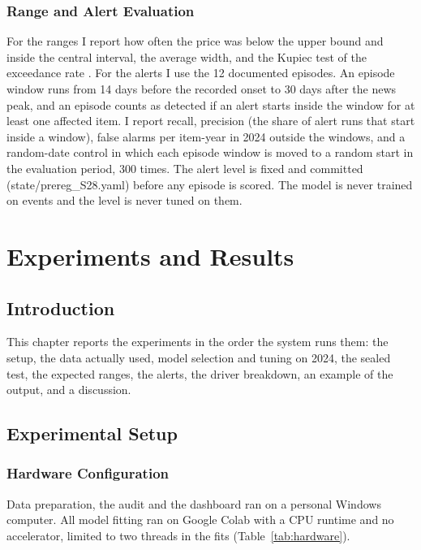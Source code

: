 \documentclass[12pt]{report}
\begin{document}
\subsection{Range and Alert Evaluation}
For the ranges I report how often the price was below the upper bound and inside the central interval, the average width, and the Kupiec test of the exceedance rate \cite{kupiec}. For the alerts I use the 12 documented episodes. An episode window runs from 14 days before the recorded onset to 30 days after the news peak, and an episode counts as detected if an alert starts inside the window for at least one affected item. I report recall, precision (the share of alert runs that start inside a window), false alarms per item-year in 2024 outside the windows, and a random-date control in which each episode window is moved to a random start in the evaluation period, 300 times. The alert level is fixed and committed (state/prereg\_S28.yaml) before any episode is scored. The model is never trained on events and the level is never tuned on them.

\chapter{Experiments and Results}

\section{Introduction}
This chapter reports the experiments in the order the system runs them: the setup, the data actually used, model selection and tuning on 2024, the sealed test, the expected ranges, the alerts, the driver breakdown, an example of the output, and a discussion.

\section{Experimental Setup}

\subsection{Hardware Configuration}
Data preparation, the audit and the dashboard ran on a personal Windows computer. All model fitting ran on Google Colab with a CPU runtime and no accelerator, limited to two threads in the fits (Table~\ref{tab:hardware}).
\end{document}
